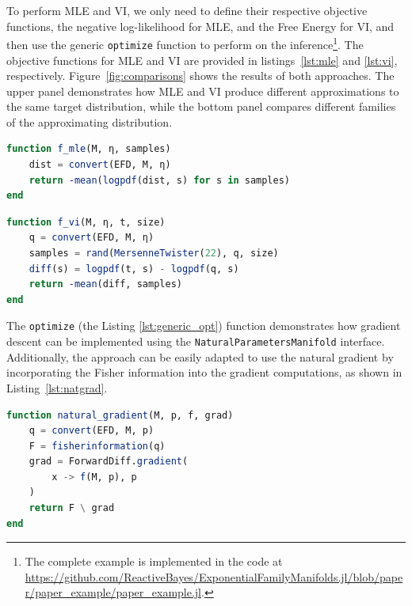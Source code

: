 \documentclass{juliacon}
\begin{document}
To perform MLE and VI, we only need to define their respective objective functions, the negative log-likelihood for MLE, and the Free Energy for VI, and then use the generic \texttt{optimize} function to perform on the inference\footnote{The complete example is implemented in the code at \url{https://github.com/ReactiveBayes/ExponentialFamilyManifolds.jl/blob/paper/paper_example/paper_example.jl}.}. The objective functions for MLE and VI are provided in listings~\ref{lst:mle} and \ref{lst:vi}, respectively. Figure~\ref{fig:comparisons} shows the results of both approaches. The upper panel demonstrates how MLE and VI produce different approximations to the same target distribution, while the bottom panel compares different families of the approximating distribution.
\vspace{-0.5em}
\begin{lstlisting}[language=Julia, caption={Objective functions for MLE}, label={lst:mle}]
function f_mle(M, η, samples)
    dist = convert(EFD, M, η)
    return -mean(logpdf(dist, s) for s in samples)
end
\end{lstlisting}
\vspace{-0.5em}
\begin{lstlisting}[language=Julia, caption={Objective functions for VI}, label={lst:vi}]
function f_vi(M, η, t, size)
    q = convert(EFD, M, η)
    samples = rand(MersenneTwister(22), q, size)
    diff(s) = logpdf(t, s) - logpdf(q, s)
    return -mean(diff, samples)
end
\end{lstlisting}
\vspace{1em}
The \texttt{optimize} (the Listing \ref{lst:generic_opt}) function demonstrates how gradient descent can be implemented using the \texttt{NaturalParametersManifold} interface. Additionally, the approach can be easily adapted to use the natural gradient \cite{amari_natural_1998} by incorporating the Fisher information into the gradient computations, as shown in Listing~\ref{lst:natgrad}.

\begin{lstlisting}[language=Julia, label={lst:natgrad}, caption={Computing the natural gradient with \texttt{ForwardDiff.jl} \cite{revels_forward-mode_2016}}]
function natural_gradient(M, p, f, grad)
    q = convert(EFD, M, p)
    F = fisherinformation(q)
    grad = ForwardDiff.gradient(
        x -> f(M, p), p
    )
    return F \ grad
end
\end{lstlisting}

\end{document}
